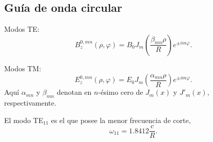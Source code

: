 \subsection{Guía de onda circular}

Modos TE:
\begin{equation}
B_z^{0,mn}(\rho,\varphi)=B_0J_m(\frac{\beta_{mn}\rho}{R})e^{\pm im\varphi}.
\end{equation}

Modos TM:	
\begin{equation}
E_z^{0,mn}(\rho,\varphi)=E_0J_m(\frac{\alpha_{mn}\rho}{R})e^{\pm im\varphi}.
\end{equation}
Aquí $\alpha_{mn}$ y $\beta_{mn}$ denotan en $n$-ésimo cero de $J_m(x)$ y $J'_m(x)$, respectivamente.

El modo TE$_{11}$ es el que posee la menor frecuencia de corte,
\begin{equation}
\omega_{11}=1.8412\frac{c}{R}.
\end{equation}